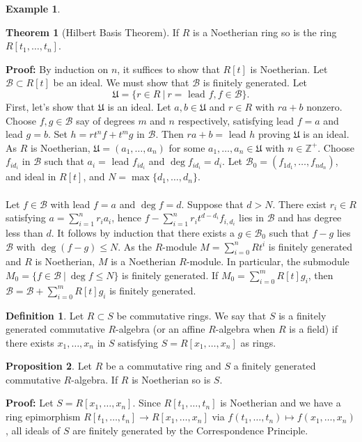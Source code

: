 \documentclass[11pt]{amsbook}%
\theoremstyle{plain}
\theoremstyle{definition}
\newtheorem{definition*}{Definition}
\newtheorem*{example*}{Example}
\newtheorem{proposition}[theorem]{Proposition}
\newtheorem{theorem}{Theorem}
\numberwithin{equation}{section}
\newcommand{\ZZ}{\mathbb Z}
\newcommand{\BC}{\mathcal B}
\newcommand{\UF}{\mathfrak U}
\renewcommand{\proof}{ \textbf{Proof: }}
\begin{document}
\begin{example*}
\begin{theorem}[Hilbert Basis Theorem]
  If $R$ is a Noetherian ring so is the ring $R[t_{1}, \dots, t_{n}]$.
\end{theorem} \vspace{1.8em}
\proof By induction on $n$, it suffices to show that $R[t]$ is Noetherian.
Let $\BC \subset R[t]$ be an ideal. We must show that $\BC$ is finitely
generated. Let
$$
\UF = \{r \in R \ | \ r = \text{ lead } f, f \in \BC\}.
$$
First, let's show that $\UF$ is an ideal. Let $a, b \in \UF$ and $r \in R$ with
$ra + b$ nonzero. Choose $f, g \in \BC$ say of degrees $m$ and $n$ respectively,
satisfying lead $f = a$ and lead $g = b$. Set $h = rt^{n}f + t^{m}g$ in $\BC$.
Then $ra + b = $ lead $h$ proving $\UF$ is an ideal. As $R$ is Noetherian,
$\UF = (a_{1}, \dots, a_{n})$ for some $a_{1}, \dots, a_{n} \in \UF$
with $n \in \ZZ^{+}$. Choose $f_{id_{i}}$ in $\BC$ such that $a_{i} = $ lead
$f_{id_{i}}$ and $\deg f_{id_{i}} = d_{i}$. Let $\BC_{0} = (f_{1d_{1}}, \dots, f_{nd_{n}})$,
and ideal in $R[t]$, and $N = \max\{d_{1}, \dots, d_{n}\}$. \\ \\
Let $f \in \BC$ with lead $f = a$ and $\deg f = d$. Suppose that $d > N$.
There exist $r_{i} \in R$ satisfying $a = \sum_{i=1}^{n} r_{i}a_{i}$,
hence $f - \sum_{i=1}^{n} r_{i}t^{d-d_{i}}f_{i, d_{i}}$ lies in $\BC$
and has degree less than $d$. It follows by induction that there exists a $g \in \BC_{0}$
such that $f-g$ lies $\BC$ with $\deg(f-g) \leq N$. As the $R$-module $M = \sum_{i=0}^{n} Rt^{i}$
is finitely generated and $R$ is Noetherian, $M$ is a Noetherian $R$-module.
In particular, the submodule $M_{0} = \{f \in \BC \ | \ \deg f \leq N \}$ is
finitely generated. If $M_{0} = \sum_{i=0}^{m} R[t]g_{i}$, then
$\BC = \BC + \sum_{i=0}^{m} R[t]g_{i}$ is finitely generated. \qedsymbol

\begin{definition*}
  Let $R \subset S$ be commutative rings. We say that $S$ is a finitely generated
  commutative $R$-algebra (or an affine $R$-algebra when $R$ is a field)
  if there exists $x_{1}, \dots, x_{n}$ in $S$ satisfying $S = R[x_{1}, \dots, x_{n}]$
  as rings.
\end{definition*}

\begin{proposition}
  Let $R$ be a commutative ring and $S$ a finitely generated commutative $R$-algebra. If
  $R$ is Noetherian so is $S$.
\end{proposition} \vspace{1.8em}
\proof Let $S = R[x_{1}, \dots, x_{n}]$. Since $R[t_{1}, \dots, t_{n}]$ is Noetherian
and we have a ring epimorphism $R[t_{1}, \dots, t_{n}] \longrightarrow R[x_{1}, \dots, x_{n}]$
via $f(t_{1}, \dots, t_{n}) \mapsto f(x_{1}, \dots, x_{n})$, all ideals of $S$ are
finitely generated by the Correspondence Principle. \qedsymbol


\end{example*}
\end{document}
